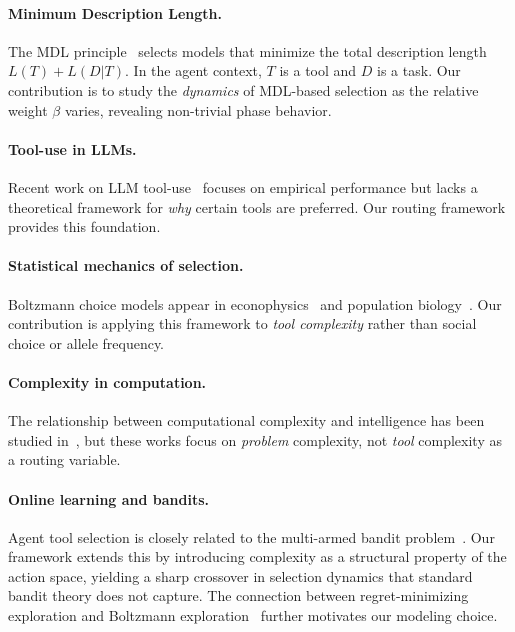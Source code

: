 \documentclass[12pt]{article}
\theoremstyle{definition}
\begin{document}
\paragraph{Minimum Description Length.} The MDL principle~\cite{r89-grunwald2007-mdl, r90-pedersen2015-mdl} selects models that minimize the total description length $L(T) + L(D|T)$. In the agent context, $T$ is a tool and $D$ is a task. Our contribution is to study the \emph{dynamics} of MDL-based selection as the relative weight $\beta$ varies, revealing non-trivial phase behavior.

\paragraph{Tool-use in LLMs.} Recent work on LLM tool-use~\cite{r91-wang2023-toolformer, r92-shinn2023-refrexp} focuses on empirical performance but lacks a theoretical framework for \emph{why} certain tools are preferred. Our routing framework provides this foundation.

\paragraph{Statistical mechanics of selection.} Boltzmann choice models appear in econophysics~\cite{r93-terranova2009-boltzmann} and population biology~\cite{r94-kwasnovicz2022-boltzmann}. Our contribution is applying this framework to \emph{tool complexity} rather than social choice or allele frequency.

\paragraph{Complexity in computation.} The relationship between computational complexity and intelligence has been studied in~\cite{r95-hofstadter1979-godel, r96-chaitin1975-randomness}, but these works focus on \emph{problem} complexity, not \emph{tool} complexity as a routing variable.

\paragraph{Online learning and bandits.} Agent tool selection is closely related to the multi-armed bandit problem~\cite{r98-auer2002-bandit, r99-garivier2011-ucb}. Our framework extends this by introducing complexity as a structural property of the action space, yielding a sharp crossover in selection dynamics that standard bandit theory does not capture. The connection between regret-minimizing exploration and Boltzmann exploration~\cite{r100-hutter2005-boltzmann} further motivates our modeling choice.
\end{document}
